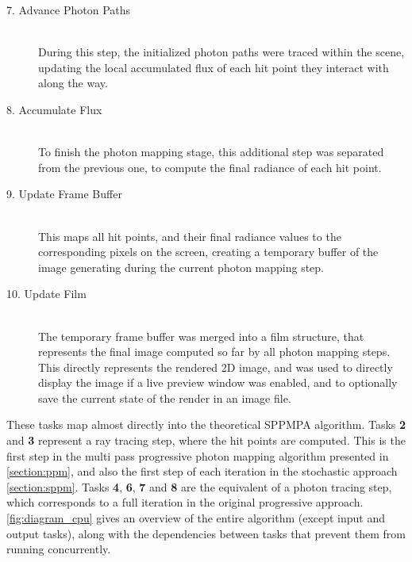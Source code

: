 \documentclass[main.tex]{subfiles}
\begin{document}
\begin{description}
\item[7. Advance Photon Paths] \hfill \\
  During this step, the initialized photon paths were traced within the scene, updating the local accumulated flux of each hit point they interact with along the way.

\item[8. Accumulate Flux] \hfill \\
  To finish the photon mapping stage, this additional step was separated from the previous one, to compute the final radiance of each hit point.

\item[9. Update Frame Buffer] \hfill \\
  This maps all hit points, and their final radiance values to the corresponding pixels on the screen, creating a temporary buffer of the image generating during the current photon mapping step.

\item[10. Update Film] \hfill \\
  The temporary frame buffer was merged into a film structure, that represents the final image computed so far by all photon mapping steps. This directly represents the rendered 2D image, and was used to directly display the image if a live preview window was enabled, and to optionally save the current state of the render in an image file.

\end{description}

These tasks map almost directly into the theoretical SPPMPA algorithm. Tasks \textbf{2} and \textbf{3} represent a ray tracing step, where the hit points are computed. This is the first step in the multi pass progressive photon mapping algorithm presented in \cref{section:ppm}, and also the first step of each iteration in the stochastic approach \cref{section:sppm}. Tasks \textbf{4}, \textbf{6}, \textbf{7} and \textbf{8} are the equivalent of a photon tracing step, which corresponds to a full iteration in the original progressive approach. \cref{fig:diagram_cpu} gives an overview of the entire algorithm (except input and output tasks), along with the dependencies between tasks that prevent them from running concurrently.
\end{document}
